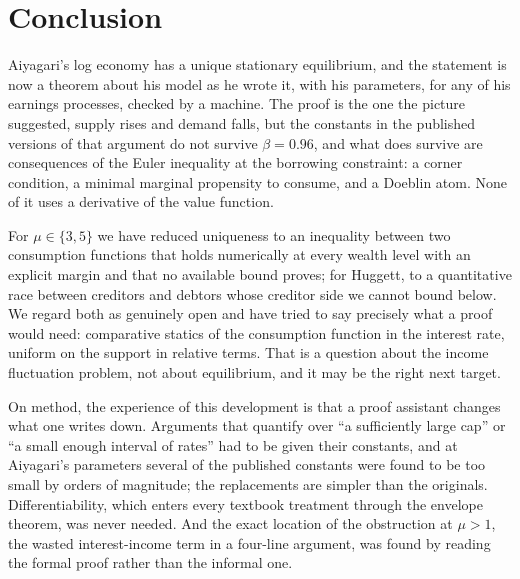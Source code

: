 \section{Conclusion}

Aiyagari's log economy has a unique stationary equilibrium, and the statement is now a theorem
about his model as he wrote it, with his parameters, for any of his earnings processes, checked
by a machine. The proof is the one the picture suggested, supply rises and demand falls, but the
constants in the published versions of that argument do not survive $\beta=0.96$, and what does
survive are consequences of the Euler inequality at the borrowing constraint: a corner condition, a
minimal marginal propensity to consume, and a Doeblin atom. None of it uses a derivative of the
value function.

For $\mu\in\{3,5\}$ we have reduced uniqueness to an inequality between two consumption functions
that holds numerically at every wealth level with an explicit margin and that no available bound
proves; for Huggett, to a quantitative race between creditors and debtors whose creditor side we
cannot bound below. We regard both as genuinely open and have tried to say precisely what a proof
would need: comparative statics of the consumption function in the interest rate, uniform on the
support in relative terms. That is a question about the income fluctuation problem, not about
equilibrium, and it may be the right next target.

On method, the experience of this development is that a proof assistant changes what one writes
down. Arguments that quantify over ``a sufficiently large cap'' or ``a small enough interval of
rates'' had to be given their constants, and at Aiyagari's parameters several of the published
constants were found to be too small by orders of magnitude; the replacements are simpler than the
originals. Differentiability, which enters every textbook treatment through the envelope theorem,
was never needed. And the exact location of the obstruction at $\mu>1$, the wasted interest-income
term in a four-line argument, was found by reading the formal proof rather than the informal one.
